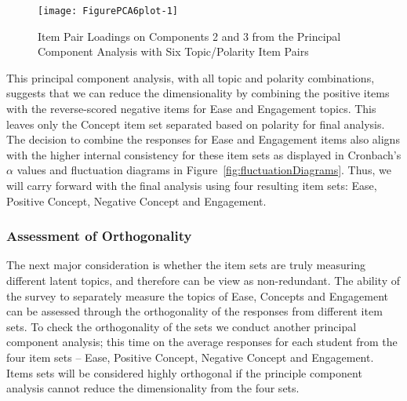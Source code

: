 \documentclass[11pt]{isuthesis}\usepackage[]{graphicx}\usepackage[]{color}
\newenvironment{knitrout}{}{} %
\begin{document}
\begin{knitrout}
\color{fgcolor}\begin{figure}[hbt]

{\centering \texttt{[image: FigurePCA6plot-1]} 

}

\caption[Item Pair Loadings on Components 2 and 3 from the Principal Component Analysis with Six Topic/Polarity Item Pairs]{Item Pair Loadings on Components 2 and 3 from the Principal Component Analysis with Six Topic/Polarity Item Pairs}\label{fig:PCA6plot}
\end{figure}


\end{knitrout}

This principal component analysis, with all topic and polarity combinations, suggests that we can reduce the dimensionality by combining the positive items with the reverse-scored negative items for Ease and Engagement topics.  This leaves only the Concept item set separated based on polarity for final analysis.  The decision to combine the responses for Ease and Engagement items also aligns with the higher internal consistency for these item sets as displayed in Cronbach's $\alpha$ values and fluctuation diagrams in Figure~\ref{fig:fluctuationDiagrams}. Thus, we will carry forward with the final analysis using four resulting item sets: Ease, Positive Concept, Negative Concept and Engagement. 

\subsubsection{Assessment of Orthogonality} 

The next major consideration is whether the item sets are truly measuring different latent topics, and therefore can be view as non-redundant. The ability of the survey to separately measure the topics of Ease, Concepts and Engagement can be assessed through the orthogonality of the responses from different item sets. To check the orthogonality of the sets we conduct another principal component analysis; this time on the average responses for each student from the four item sets -- Ease, Positive Concept, Negative Concept and Engagement.  Items sets will be considered highly orthogonal if the principle component analysis cannot reduce the dimensionality from the four sets. 
\end{document}
